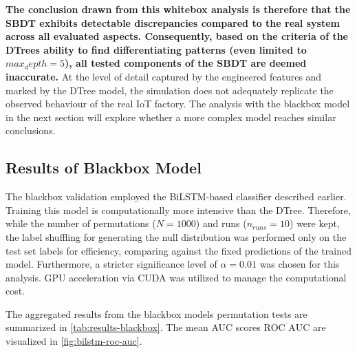\textbf{The conclusion drawn from this whitebox analysis is therefore that the SBDT exhibits detectable discrepancies compared to the real system across all evaluated aspects. Consequently, based on the criteria of the DTrees ability to find differentiating patterns (even limited to $max_depth=5$), all tested components of the SBDT are deemed inaccurate.} At the level of detail captured by the engineered features and marked by the DTree model, the simulation does not adequately replicate the observed behaviour of the real IoT factory. The analysis with the blackbox model in the next section will explore whether a more complex model reaches similar conclusions.

\subsection*{Results of Blackbox Model}

The blackbox validation employed the BiLSTM-based classifier described earlier. Training this model is computationally more intensive than the DTree. Therefore, while the number of permutations ($N=1000$) and runs ($n_{runs}=10$) were kept, the label shuffling for generating the null distribution was performed only on the test set labels for efficiency, comparing against the fixed predictions of the trained model. Furthermore, a stricter significance level of $\alpha = 0.01$ was chosen for this analysis. GPU acceleration via CUDA \autocite{NVIDIA_CUDA} was utilized to manage the computational cost.

The aggregated results from the blackbox models permutation tests are summarized in \autoref{tab:results-blackbox}. The mean AUC scores $\overline{\text{ROC AUC}}$ are visualized in \autoref{fig:bilstm-roc-auc}.

